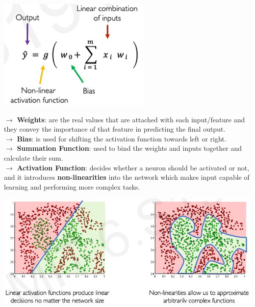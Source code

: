 \documentclass[letterpaper, 10.5pt,landscape]{article}
\begin{document}
\begin{multicols*}{3}
\vspace{-7pt}
\begin{center}
    \begin{minipage}{0.5\linewidth}
    \includegraphics[width=\textwidth]{figures/perceptron_artificial_neuron_equation.png}
    \end{minipage}
\end{center}
\vspace{-5pt}





$\rightarrow$ \textbf{Weights}: are the real values that are attached with each input/feature and they convey the importance of that feature in predicting the final output. \\
$\rightarrow$ \textbf{Bias}: is used for shifting the activation function towards left or right.\\
$\rightarrow$ \textbf{Summation Function}: used to bind the weights and inputs together and calculate their sum. \\
$\rightarrow$ \textbf{Activation Function}: decides whether a neuron should be activated or not, and it introduces \textbf{non-linearities} into the network which makes input capable of learning and performing more complex tasks. 

\vspace{-5pt}
\begin{center}
    \begin{minipage}{\linewidth}
    \includegraphics[width=\textwidth]{figures/activation_function_need.png}
    \end{minipage}
\end{center}
\vspace{-5pt}



\end{multicols*}
\end{document}
